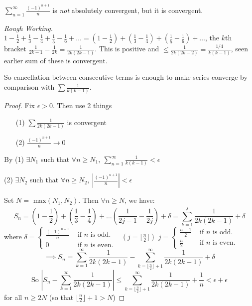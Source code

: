 \begin{example}
$\sum_{n=1}^{\infty} \frac{(-1)^{n+1}}{n}$ is \emph{not} absolutely convergent, but it is convergent.


\textit{Rough Working.} $1 - \frac{1}{2} + \frac{1}{3} - \frac{1}{4} + \frac{1}{5} - \frac{1}{6} + \dots = (1-\frac{1}{2}) + (\frac{1}{3} - \frac{1}{4}) + (\frac{1}{5} -\frac{1}{6}) + \dots$, the $k$th bracket $\frac{1}{2k-1} - \frac{1}{2k} = \frac{1}{2k(2k-1)}$. This is positive and $\leq \frac{1}{2k(2k-2)} = \frac{1/4}{k(k-1)}$, seen earlier sum of these is convergent.

So cancellation between consecutive terms is enough to make series converge by comparison with $\sum \frac{1}{k(k-1)}$.

\begin{proof}
Fix $\epsilon >0.$ Then use 2 things\begin{enumerate}
\item[(1)] $\sum \frac{1}{2k(2k-1)}$	is convergent
\item[(2)] $\frac{(-1)^{n+1}}{n}\to 0$
\end{enumerate}
By (1) $\exists N_1$ such that $\forall n \geq N_1,~ \sum_{n=1}^{\infty} \frac{1}{k(k-1)} < \epsilon$

(2) $\exists N_2$ such that $\forall n \geq N_2,~ \left|\frac{(-1)^{n+1}}{n}\right| < \epsilon$

Set $N =$ max$(N_1,N_2)$. Then $\forall n \geq N$, we have:
\[S_n = \left(1-\frac{1}{2}\right) + \left(\frac{1}{3} - \frac{1}{4}\right) + \dots \left(\frac{1}{2j-1} - \frac{1}{2j} \right) + \delta = \sum_{k=1}^{j} \frac{1}{2k(2k-1)} + \delta\] 
where $\delta = \begin{cases}
 	\frac{(-1)^{n+1}}{n} & \text{ if } n \text{ is odd.}\\
 	0 & \text{ if } n \text{ is even.}
 \end{cases}
$ $~~\left(j = \lfloor \frac{n}{2} \rfloor\right)$   $j = \begin{cases}
 	\frac{n-1}{2} & \text{ if } n \text{ is odd.}\\
 	\frac{n}{2} & \text{ if } n \text{ is even.}
 \end{cases}
$
\[\implies S_n = \sum_{k=1}^{\infty} \frac{1}{2k(2k-1)} - \sum_{k=\lfloor \frac{n}{2} \rfloor + 1}^{\infty} \frac{1}{2k(2k-1)} + \delta\]
\[\text{So } \left|S_n - \sum_{k=1}^{\infty} \frac{1}{2k(2k-1)} \right| \leq \sum_{k=\lfloor \frac{n}{2} \rfloor + 1}^{\infty} \frac{1}{2k(2k-1)} + \frac{1}{n} < \epsilon + \epsilon\] for all $n \geq 2N$ (so that $\lfloor \frac{n}{2} \rfloor + 1 >N$) 
\end{proof}
\end{example}\vspace*{10pt}


